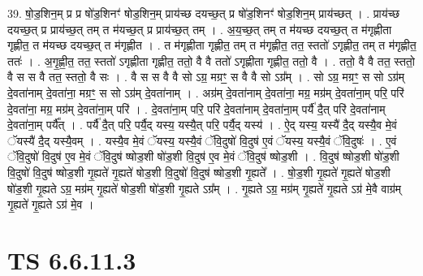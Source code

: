\documentclass[17pt]{extarticle}
\begin{document}
39. षो॒ड॒शिन॒म् प्र प्र षो॑ड॒शिनꣳ॑ षोड॒शिन॒म् प्राय॑च्छ दयच्छ॒त् प्र षो॑ड॒शिनꣳ॑ षोड॒शिन॒म् प्राय॑च्छत् । . प्राय॑च्छ दयच्छ॒त् प्र प्राय॑च्छ॒त् तम् त म॑यच्छ॒त् प्र प्राय॑च्छ॒त् तम् । . अ॒य॒च्छ॒त् तम् त म॑यच्छ दयच्छ॒त् त म॑गृह्णीता गृह्णीत॒ त म॑यच्छ दयच्छ॒त् त म॑गृह्णीत । . त म॑गृह्णीता गृह्णीत॒ तम् त म॑गृह्णीत॒ तत॒ स्ततो॑ ऽगृह्णीत॒ तम् त म॑गृह्णीत॒ ततः॑ । . अ॒गृ॒ह्णी॒त॒ तत॒ स्ततो॑ ऽगृह्णीता गृह्णीत॒ ततो॒ वै वै ततो॑ ऽगृह्णीता गृह्णीत॒ ततो॒ वै । . ततो॒ वै वै तत॒ स्ततो॒ वै स स वै तत॒ स्ततो॒ वै सः । . वै स स वै वै सो ऽग्र॒ मग्रꣳ॒॒ स वै वै सो ऽग्र᳚म् । . सो ऽग्र॒ मग्रꣳ॒॒ स सो ऽग्र॑म् दे॒वता॑नाम् दे॒वता॑ना॒ मग्रꣳ॒॒ स सो ऽग्र॑म् दे॒वता॑नाम् । . अग्र॑म् दे॒वता॑नाम् दे॒वता॑ना॒ मग्र॒ मग्र॑म् दे॒वता॑ना॒म् परि॒ परि॑ दे॒वता॑ना॒ मग्र॒ मग्र॑म् दे॒वता॑ना॒म् परि॑ । . दे॒वता॑ना॒म् परि॒ परि॑ दे॒वता॑नाम् दे॒वता॑ना॒म् पर्यै॑ दै॒त् परि॑ दे॒वता॑नाम् दे॒वता॑ना॒म् पर्यै᳚त् । . पर्यै॑ दै॒त् परि॒ पर्यै॒द् यस्य॒ यस्यै॒त् परि॒ पर्यै॒द् यस्य॑ । . ऐ॒द् यस्य॒ यस्यै॑ दै॒द् यस्यै॒व मे॒वं ॅयस्यै॑ दै॒द् यस्यै॒वम् । . यस्यै॒व मे॒वं ॅयस्य॒ यस्यै॒वं ॅवि॒दुषो॑ वि॒दुष॑ ए॒वं ॅयस्य॒ यस्यै॒वं ॅवि॒दुषः॑ । . ए॒वं ॅवि॒दुषो॑ वि॒दुष॑ ए॒व मे॒वं ॅवि॒दुष॑ ष्षोड॒शी षो॑ड॒शी वि॒दुष॑ ए॒व मे॒वं ॅवि॒दुष॑ ष्षोड॒शी । . वि॒दुष॑ ष्षोड॒शी षो॑ड॒शी वि॒दुषो॑ वि॒दुष॑ ष्षोड॒शी गृ॒ह्यते॑ गृ॒ह्यते॑ षोड॒शी वि॒दुषो॑ वि॒दुष॑ ष्षोड॒शी गृ॒ह्यते᳚ । . षो॒ड॒शी गृ॒ह्यते॑ गृ॒ह्यते॑ षोड॒शी षो॑ड॒शी गृ॒ह्यते ऽग्र॒ मग्र॑म् गृ॒ह्यते॑ षोड॒शी षो॑ड॒शी गृ॒ह्यते ऽग्र᳚म् । . गृ॒ह्यते ऽग्र॒ मग्र॑म् गृ॒ह्यते॑ गृ॒ह्यते ऽग्र॑ मे॒वै वाग्र॑म् गृ॒ह्यते॑ गृ॒ह्यते ऽग्र॑ मे॒व । \newline
\pagebreak
{}

\section{ TS 6.6.11.3 }
\end{document}

